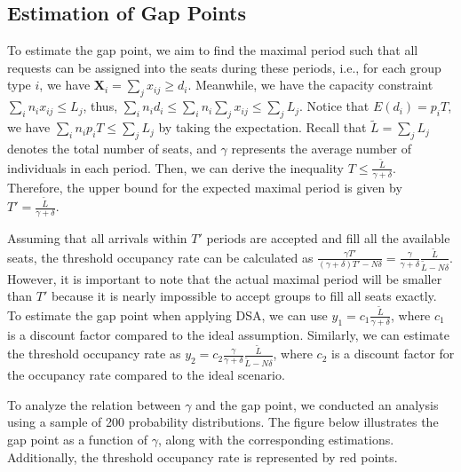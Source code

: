 


\subsection{Estimation of Gap Points}
To estimate the gap point, we aim to find the maximal period such that all requests can be assigned into the seats during these periods, i.e., for each group type $i$, we have $\bm{X}_{i} = \sum_{j} x_{ij} \geq d_i$. Meanwhile, we have the capacity constraint $\sum_{i} n_{i} x_{ij} \leq L_j$, thus, $\sum_{i} n_i d_i \leq \sum_{i} n_i \sum_{j} x_{ij} \leq \sum_{j} L_{j}$. Notice that $E(d_i) = p_i T$, we have $\sum_{i} n_i p_i T \leq \sum_{j} L_{j}$ by taking the expectation. Recall that $\tilde{L} = \sum_{j} L_{j}$ denotes the total number of seats, and $\gamma$ represents the average number of individuals in each period. Then, we can derive the inequality $T \leq \frac{\tilde{L}}{\gamma + \delta}$. Therefore, the upper bound for the expected maximal period is given by $T' = \frac{\tilde{L}}{\gamma + \delta}$.


Assuming that all arrivals within $T'$ periods are accepted and fill all the available seats, the threshold occupancy rate can be calculated as $\frac{\gamma T'}{(\gamma+ \delta)T' - N \delta} = \frac{\gamma}{\gamma +\delta} \frac{\tilde{L}}{\tilde{L}-N \delta}$. However, it is important to note that the actual maximal period will be smaller than $T{'}$ because it is nearly impossible to accept groups to fill all seats exactly. To estimate the gap point when applying DSA, we can use $y_1 = c_1 \frac{\tilde{L}}{\gamma + \delta}$, where $c_1$ is a discount factor compared to the ideal assumption. Similarly, we can estimate the threshold occupancy rate as $y_2 = c_2 \frac{\gamma}{\gamma +\delta} \frac{\tilde{L}}{\tilde{L}-N \delta}$, where $c_2$ is a discount factor for the occupancy rate compared to the ideal scenario.

To analyze the relation between $\gamma$ and the gap point, we conducted an analysis using a sample of 200 probability distributions. The figure below illustrates the gap point as a function of $\gamma$, along with the corresponding estimations.  Additionally, the threshold occupancy rate is represented by red points. 

